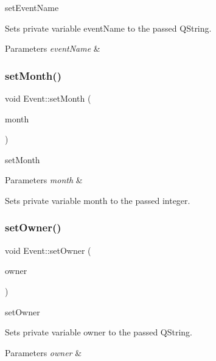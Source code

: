 set\+Event\+Name 

Sets private variable event\+Name to the passed Q\+String. 
\begin{DoxyParams}{Parameters}
{\em event\+Name} & \\
\hline
\end{DoxyParams}
\mbox{\label{class_event_acd9e57cf462362474a5734874c5267e4}} 
\subsubsection{\texorpdfstring{set\+Month()}{setMonth()}}
{\footnotesize\ttfamily void Event\+::set\+Month (\begin{DoxyParamCaption}\item[{int}]{month }\end{DoxyParamCaption})}



set\+Month 


\begin{DoxyParams}{Parameters}
{\em month} & \\
\hline
\end{DoxyParams}
Sets private variable month to the passed integer. \mbox{\label{class_event_a4c5b75b1d4c162cb7489ee6a4ced8af0}} 
\subsubsection{\texorpdfstring{set\+Owner()}{setOwner()}}
{\footnotesize\ttfamily void Event\+::set\+Owner (\begin{DoxyParamCaption}\item[{Q\+String}]{owner }\end{DoxyParamCaption})}



set\+Owner 

Sets private variable owner to the passed Q\+String. 
\begin{DoxyParams}{Parameters}
{\em owner} & \\
\hline
\end{DoxyParams}
\mbox{\label{class_event_a4e0b462c919ef361c1bce8aa6f806b77}} 
